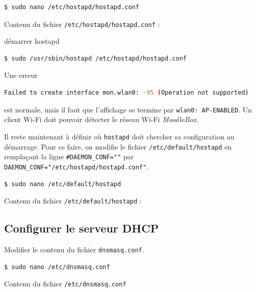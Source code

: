 \documentclass[11pt]{article}
\begin{document}
\begin{lstlisting}[language=bash]
$ sudo nano /etc/hostapd/hostapd.conf
\end{lstlisting}

Contenu du fichier \lstinline{/etc/hostapd/hostapd.conf} :



\begin{verification}
démarrer hostapd
\begin{lstlisting}[language=bash]
$ sudo /usr/sbin/hostapd /etc/hostapd/hostapd.conf
\end{lstlisting}

Une erreur
\begin{lstlisting}[language=bash]
Failed to create interface mon.wlan0: -95 (Operation not supported)
\end{lstlisting}
est normale, mais il faut que l'affichage se termine par \lstinline{wlan0: AP-ENABLED}. Un client Wi-Fi doit pouvoir détecter le réseau Wi-Fi \emph{MoodleBox}.
\end{verification}


Il reste maintenant à définir où \lstinline{hostapd} doit chercher sa configuration au démarrage. Pour ce faire, on modifie le fichier \lstinline{/etc/default/hostapd} en remplaçant la ligne \lstinline{#DAEMON_CONF=""} par \lstinline{DAEMON_CONF="/etc/hostapd/hostapd.conf"}.

\begin{lstlisting}[language=bash]
$ sudo nano /etc/default/hostapd
\end{lstlisting}

Contenu du fichier \lstinline{/etc/default/hostapd} :



\subsection{Configurer le serveur DHCP}

Modifier le contenu du fichier \lstinline{dnsmasq.conf}.

\begin{lstlisting}[language=bash]
$ sudo nano /etc/dnsmasq.conf
\end{lstlisting}

Contenu du fichier \lstinline{/etc/dnsmasq.conf}


\end{document}

